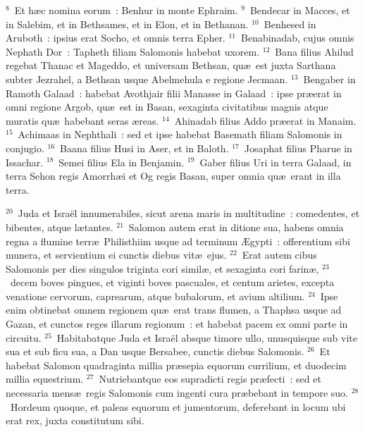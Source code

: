 ${}^{8}$~Et h\ae c nomina eorum~: Benhur in monte Ephraim.
${}^{9}$~Bendecar in Macces, et in Salebim, et in Bethsames, et in Elon, et in Bethanan.
${}^{10}$~Benhesed in Aruboth~: ipsius erat Socho, et omnis terra Epher.
${}^{11}$~Benabinadab, cujus omnis Nephath Dor~: Tapheth filiam Salomonis habebat uxorem.
${}^{12}$~Bana filius Ahilud regebat Thanac et Mageddo, et universam Bethsan, qu\ae\ est juxta Sarthana subter Jezrahel, a Bethsan usque Abelmehula e regione Jecmaan.
${}^{13}$~Bengaber in Ramoth Galaad~: habebat Avothjair filii Manasse in Galaad~: ipse pr\ae erat in omni regione Argob, qu\ae\ est in Basan, sexaginta civitatibus magnis atque muratis qu\ae\ habebant seras \ae reas.
${}^{14}$~Ahinadab filius Addo pr\ae erat in Manaim.
${}^{15}$~Achimaas in Nephthali~: sed et ipse habebat Basemath filiam Salomonis in conjugio.
${}^{16}$~Baana filius Husi in Aser, et in Baloth.
${}^{17}$~Josaphat filius Pharue in Issachar.
${}^{18}$~Semei filius Ela in Benjamin.
${}^{19}$~Gaber filius Uri in terra Galaad, in terra Sehon regis Amorrh\ae i et Og regis Basan, super omnia qu\ae\ erant in illa terra.


${}^{20}$~Juda et Isra\"el innumerabiles, sicut arena maris in multitudine~: comedentes, et bibentes, atque l\ae tantes.
${}^{21}$~Salomon autem erat in ditione sua, habens omnia regna a flumine terr\ae\ Philisthiim usque ad terminum \AE gypti~: offerentium sibi munera, et servientium ei cunctis diebus vit\ae\ ejus.
${}^{22}$~Erat autem cibus Salomonis per dies singulos triginta cori simil\ae , et sexaginta cori farin\ae ,
${}^{23}$~decem boves pingues, et viginti boves pascuales, et centum arietes, excepta venatione cervorum, caprearum, atque bubalorum, et avium altilium.
${}^{24}$~Ipse enim obtinebat omnem regionem qu\ae\ erat trans flumen, a Thaphsa usque ad Gazan, et cunctos reges illarum regionum~: et habebat pacem ex omni parte in circuitu.
${}^{25}$~Habitabatque Juda et Isra\"el absque timore ullo, unusquisque sub vite sua et sub ficu sua, a Dan usque Bersabee, cunctis diebus Salomonis.
${}^{26}$~Et habebat Salomon quadraginta millia pr\ae sepia equorum currilium, et duodecim millia equestrium.
${}^{27}$~Nutriebantque eos supradicti regis pr\ae fecti~: sed et necessaria mens\ae\ regis Salomonis cum ingenti cura pr\ae bebant in tempore suo.
${}^{28}$~Hordeum quoque, et paleas equorum et jumentorum, deferebant in locum ubi erat rex, juxta constitutum sibi.



